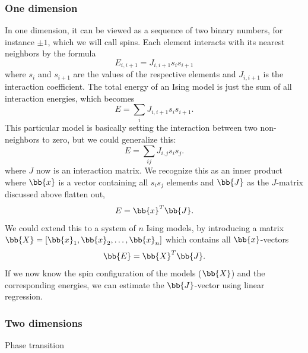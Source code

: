\subsubsection{One dimension}
In one dimension, it can be viewed as a sequence of two binary numbers, for instance $\pm1$, which we will call spins. Each element interacts with its nearest neighbors by the formula
\begin{equation}
E_{i,i+1}=J_{i,i+1}s_is_{i+1}
\end{equation}
where $s_i$ and $s_{i+1}$ are the values of the respective elements and $J_{i,i+1}$ is the interaction coefficient. The total energy of an Ising model is just the sum of all interaction energies, which becomes
\begin{equation}
E=\sum_iJ_{i,i+1}s_is_{i+1}.
\end{equation}
This particular model is basically setting the interaction between two non-neighbors to zero, but we could generalize this:
\begin{equation}
E=\sum_{ij}J_{i,j}s_is_j.
\end{equation}
where $J$ now is an interaction matrix. We recognize this as an inner product where $\bb{x}$ is a vector containing all $s_is_j$ elements and $\bb{J}$ as the $J$-matrix discussed above flatten out,
\begin{equation}
E=\bb{x}^T\bb{J}.
\end{equation}
We could extend this to a system of $n$ Ising models, by introducing a matrix $\bb{X}=[\bb{x}_1, \bb{x}_2,\hdots,\bb{x}_n]$ which contains all $\bb{x}$-vectors
\begin{equation}
\bb{E}=\bb{X}^T\bb{J}.
\end{equation}
If we now know the spin configuration of the models ($\bb{X}$) and the corresponding energies, we can estimate the $\bb{J}$-vector using linear regression.

\subsubsection{Two dimensions}
Phase transition